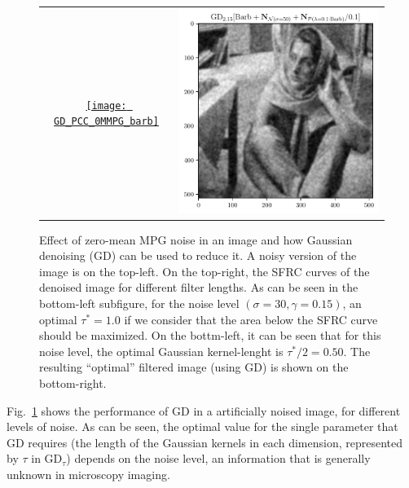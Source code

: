 \documentclass{article}
\begin{document}
\begin{figure}
{\begin{tabular}{cc}
      \href{https://nbviewer.org/github/vicente-gonzalez-ruiz/denoising/blob/main/figs/gaussian_denoising.ipynb\#GD_PCC_0MMPG_barb}{\texttt{[image: GD\_PCC\_0MMPG\_barb]}} & \href{https://nbviewer.org/github/vicente-gonzalez-ruiz/denoising/blob/main/figs/gaussian_denoising.ipynb\#GD_0MMPG_barb}{\includegraphics{GD_0MMPG_barb}}
    \end{tabular}
  }
  \caption{Effect of zero-mean MPG noise in an image and how Gaussian
    denoising (GD) can be used to reduce it. A noisy version of the
    image is on the top-left. On the top-right, the SFRC curves
    of the denoised image for different filter lengths. As can be seen
    in the bottom-left subfigure, for the noise level
    $(\sigma=30, \gamma=0.15)$, an optimal $\tau^*=1.0$ if
    we consider that the area below the SFRC curve should be maximized.
    On the bottm-left, it can be seen that for this noise level,
    the optimal Gaussian kernel-lenght is $\tau^*/2=0.50$. The resulting
    ``optimal'' filtered image (using GD) is shown on the bottom-right.
    \label{fig:GD_0MMPG}}
\end{figure}

Fig.~\ref{fig:GD_0MMPG} shows the performance of GD in a artificially
noised image, for different levels of noise. As can be seen, the
optimal value for the single parameter that GD requires (the length of
the Gaussian kernels in each dimension, represented by $\tau$ in
$\mathrm{GD}_\tau$) depends on the noise level, an information that is
generally unknown in microscopy imaging.
\end{document}
